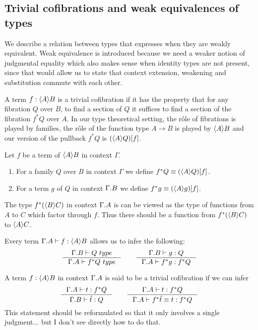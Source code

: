 \subsection{Trivial cofibrations and weak equivalences of types}
We describe a relation between types that expresses when they are weakly equivalent.
Weak equivalence is introduced because we need a weaker notion of judgmental 
equality which also makes sense when identity types are not present, since that
would allow us to state that context extension, weakening and substitution
commute with each other.

A term $f:\ctxwk{A}{B}$ is a trivial cofibration if it has the
property that for any fibration $Q$ over $B$,
to find a section of $Q$ it suffices to find a section of the fibration
$f^\ast Q$ over $A$. In our type theoretical setting, the rôle of fibrations
is played by families, the rôle of the function type $A\to B$ is played by
$\ctxwk{A}{B}$ and our version of the pullback $f^\ast Q$ is $\subst{f}{\ctxwk{A}{Q}}$.

\begin{defn}
Let $f$ be a term of $\ctxwk{A}{B}$ in context $\Gamma$.
\begin{enumerate}
\item For a family $Q$ over $B$ in context $\Gamma$ we define $f^\ast Q\jdeq\subst{f}{\ctxwk{A}{Q}}$.
\item For a term $g$ of $Q$ in context $\ctxext{\Gamma}{B}$ we define $f^\ast g\jdeq\subst{f}{\ctxwk{A}{g}}$.
\end{enumerate} 
\end{defn}
\begin{rmk}
The type $f^\ast(\ctxwk{B}{C})$ in context $\ctxext{\Gamma}{A}$ is can be viewed as the
type of functions from $A$ to $C$ which factor through $f$. Thus there should be
a function from $f^\ast(\ctxwk{B}{C})$ to $\ctxwk{A}{C}$.
\end{rmk}

\begin{rmk}
Every term $\jtermt{\ctxext{\Gamma}{A}}{\ctxwk{A}{B}}{f}$ allows us to infer the following:
\begin{equation*}
\inference{\jtype{\ctxext{\Gamma}{B}}{Q}}{\jtype{\ctxext{\Gamma}{A}}{f^\ast Q}}
\qquad
\inference{\jtermt{\ctxext{\Gamma}{B}}{Q}{g}}{\jtermt{\ctxext{\Gamma}{A}}{f^\ast Q}{f^\ast g}}
\end{equation*}
\end{rmk}


\begin{defn}
A term $f:\ctxwk{A}{B}$ in context $\ctxext{\Gamma}{A}$ is said to be a trivial
cofibration if we can infer
\begin{equation*}
\inference{\jtermt{\ctxext{\Gamma}{A}}{f^\ast Q}{t}}{\jtermt{\ctxext{\Gamma}{B}}{Q}{\tilde{t}}}\qquad
\inference{\jtermt{\ctxext{\Gamma}{A}}{f^\ast Q}{t}}{\jtermteq{\ctxext{\Gamma}{A}}{f^\ast Q}{f^\ast \tilde{t}}{t}}
\end{equation*}
{\color{red}This statement should be reformulated so that it only involves a single judgment...
but I don't see directly how to do that.}
\end{defn}

